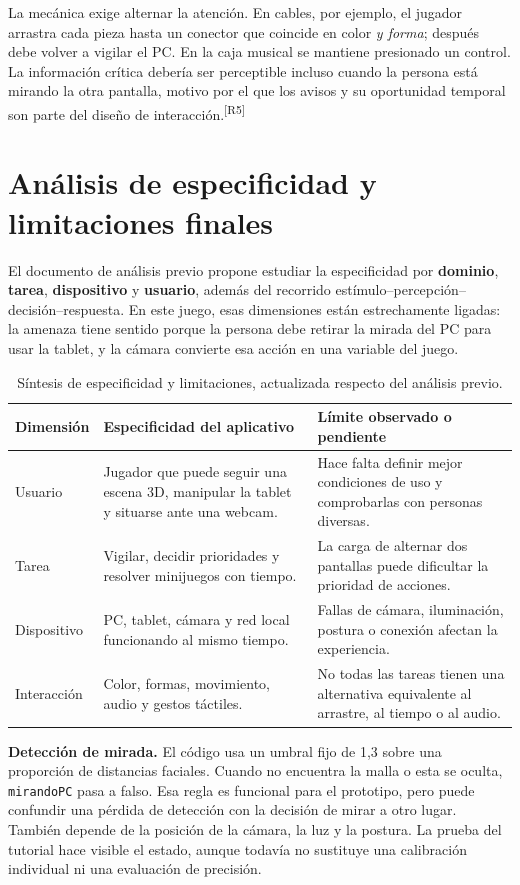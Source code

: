 \documentclass[11pt,a4paper]{article}
\newcommand{\codigo}[1]{\texttt{#1}}
\newcommand{\cita}[1]{\textsuperscript{\textcolor{Rojo}{[#1]}}}
\begin{document}
La mecánica exige alternar la atención. En cables, por ejemplo, el jugador arrastra cada pieza hasta un conector que coincide en color \emph{y forma}; después debe volver a vigilar el PC. En la caja musical se mantiene presionado un control. La información crítica debería ser perceptible incluso cuando la persona está mirando la otra pantalla, motivo por el que los avisos y su oportunidad temporal son parte del diseño de interacción.\cita{R5}

\section{Análisis de especificidad y limitaciones finales}

El documento de análisis previo propone estudiar la especificidad por \textbf{dominio}, \textbf{tarea}, \textbf{dispositivo} y \textbf{usuario}, además del recorrido estímulo--percepción--decisión--respuesta. En este juego, esas dimensiones están estrechamente ligadas: la amenaza tiene sentido porque la persona debe retirar la mirada del PC para usar la tablet, y la cámara convierte esa acción en una variable del juego.

\begin{table}[ht]
\centering
\small
\begin{tabularx}{\textwidth}{@{}p{2.5cm}X X@{}}
\toprule
Dimensión & Especificidad del aplicativo & Límite observado o pendiente\\
\midrule
Usuario & Jugador que puede seguir una escena 3D, manipular la tablet y situarse ante una webcam. & Hace falta definir mejor condiciones de uso y comprobarlas con personas diversas.\\
Tarea & Vigilar, decidir prioridades y resolver minijuegos con tiempo. & La carga de alternar dos pantallas puede dificultar la prioridad de acciones.\\
Dispositivo & PC, tablet, cámara y red local funcionando al mismo tiempo. & Fallas de cámara, iluminación, postura o conexión afectan la experiencia.\\
Interacción & Color, formas, movimiento, audio y gestos táctiles. & No todas las tareas tienen una alternativa equivalente al arrastre, al tiempo o al audio.\\
\bottomrule
\end{tabularx}
\caption{Síntesis de especificidad y limitaciones, actualizada respecto del análisis previo.}
\end{table}

\textbf{Detección de mirada.} El código usa un umbral fijo de 1,3 sobre una proporción de distancias faciales. Cuando no encuentra la malla o esta se oculta, \codigo{mirandoPC} pasa a falso. Esa regla es funcional para el prototipo, pero puede confundir una pérdida de detección con la decisión de mirar a otro lugar. También depende de la posición de la cámara, la luz y la postura. La prueba del tutorial hace visible el estado, aunque todavía no sustituye una calibración individual ni una evaluación de precisión.
\end{document}
